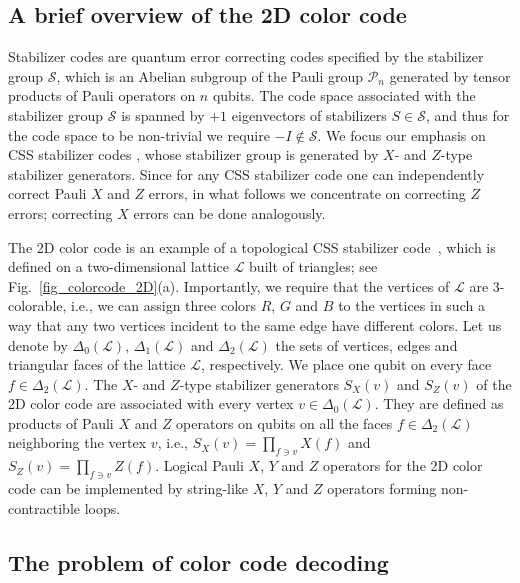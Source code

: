 \documentclass[onecolumn,letterpaper,11pt,accepted=2022-12-19]{quantumarticle}
\newcommand{\face}[2]{{\Delta_{#1}(#2)}}
\theoremstyle{definition}
\theoremstyle{lemma}
\theoremstyle{theorem}
\theoremstyle{corollary}
\begin{document}
\subsection{A brief overview of the 2D color code}


Stabilizer codes are quantum error correcting codes \cite{Shor1995, Gottesman1996} specified by the stabilizer group $\mathcal{S}$, which is an Abelian subgroup of the Pauli group $\mathcal{P}_n$ generated by tensor products of Pauli operators on $n$ qubits.
The code space associated with the stabilizer group $\mathcal{S}$ is spanned by $+1$ eigenvectors of stabilizers $S\in\mathcal{S}$, and thus for the code space to be non-trivial we require $-I\not\in\mathcal{S}$.
We focus our emphasis on CSS stabilizer codes \cite{Calderbank1996,Calderbank1997}, whose stabilizer group is generated by $X$- and $Z$-type stabilizer generators.
Since for any CSS stabilizer code one can independently correct Pauli $X$ and $Z$ errors, in what follows we concentrate on correcting $Z$ errors; correcting $X$ errors can be done analogously.


The 2D color code is an example of a topological CSS stabilizer code~\cite{Bombin2013book}, which is defined on a two-dimensional lattice $\mathcal{L}$ built of triangles; see Fig.~\ref{fig_colorcode_2D}(a).
Importantly, we require that the vertices of $\mathcal{L}$ are $3$-colorable, i.e., we can assign three colors $R$, $G$ and $B$ to the vertices in such a way that any two vertices incident to the same edge have different colors.
Let us denote by $\face 0 {\mathcal{L}}$, $\face 1 {\mathcal{L}}$ and $\face 2 {\mathcal{L}}$ the sets of vertices, edges and triangular faces of the lattice $\mathcal{L}$, respectively.
We place one qubit on every face $f\in\face 2 {\mathcal{L}}$.
The $X$- and $Z$-type stabilizer generators $S_X(v)$ and $S_Z(v)$ of the 2D color code are associated with every vertex $v\in\face 0 {\mathcal{L}}$.
They are defined as products of Pauli $X$ and $Z$ operators on qubits on all the faces $f\in\face 2 {\mathcal{L}}$ neighboring 
the vertex $v$, i.e., $S_X(v) = \prod_{f \ni v} X(f)$ and $S_Z(v) = \prod_{f \ni v} Z(f)$. 
Logical Pauli $X$, $Y$ and $Z$ operators for the 2D color code can be implemented by string-like $X$, $Y$ and $Z$ operators forming non-contractible loops.




\subsection{The problem of color code decoding}
\end{document}
